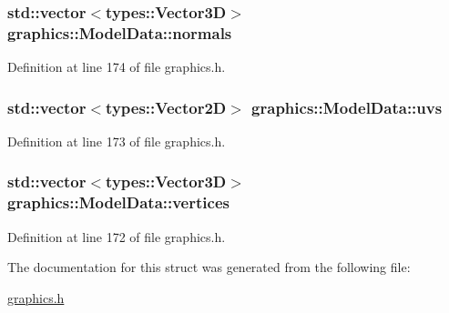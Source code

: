 \subsubsection[{normals}]{\setlength{\rightskip}{0pt plus 5cm}std\+::vector$<${\bf types\+::\+Vector3\+D}$>$ graphics\+::\+Model\+Data\+::normals}\label{structgraphics_1_1_model_data_a91996c9e01bf134a114db6796da79cfc}


Definition at line 174 of file graphics.\+h.

\hypertarget{structgraphics_1_1_model_data_ae7380400c402308ee93459a1fcf5b76a}{}
\subsubsection[{uvs}]{\setlength{\rightskip}{0pt plus 5cm}std\+::vector$<${\bf types\+::\+Vector2\+D}$>$ graphics\+::\+Model\+Data\+::uvs}\label{structgraphics_1_1_model_data_ae7380400c402308ee93459a1fcf5b76a}


Definition at line 173 of file graphics.\+h.

\hypertarget{structgraphics_1_1_model_data_a6aee645ba74e36a81efc32d094bc9df9}{}
\subsubsection[{vertices}]{\setlength{\rightskip}{0pt plus 5cm}std\+::vector$<${\bf types\+::\+Vector3\+D}$>$ graphics\+::\+Model\+Data\+::vertices}\label{structgraphics_1_1_model_data_a6aee645ba74e36a81efc32d094bc9df9}


Definition at line 172 of file graphics.\+h.



The documentation for this struct was generated from the following file\+:\begin{DoxyCompactItemize}
\item 
\hyperlink{graphics_8h}{graphics.\+h}\end{DoxyCompactItemize}

